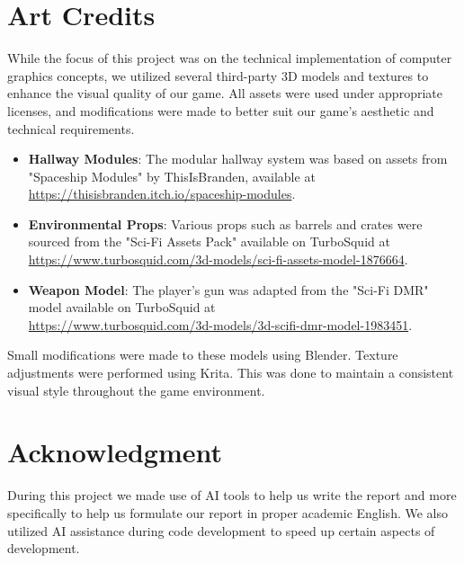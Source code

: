 \documentclass{article}
\begin{document}
\pagebreak
\section{Art Credits}
While the focus of this project was on the technical implementation of computer graphics concepts, we utilized several third-party 3D models and textures to enhance the visual quality of our game. All assets were used under appropriate licenses, and modifications were made to better suit our game's aesthetic and technical requirements.

\begin{itemize}
    \item \textbf{Hallway Modules}: The modular hallway system was based on assets from "Spaceship Modules" by ThisIsBranden, available at \url{https://thisisbranden.itch.io/spaceship-modules}.

    \item \textbf{Environmental Props}: Various props such as barrels and crates were sourced from the "Sci-Fi Assets Pack" available on TurboSquid at \url{https://www.turbosquid.com/3d-models/sci-fi-assets-model-1876664}.

    \item \textbf{Weapon Model}: The player's gun was adapted from the "Sci-Fi DMR" model available on TurboSquid at\\\url{https://www.turbosquid.com/3d-models/3d-scifi-dmr-model-1983451}.
\end{itemize}

Small modifications were made to these models using Blender. Texture adjustments were performed using Krita. This was done to maintain a consistent visual style throughout the game environment.

\section{Acknowledgment}
During this project we made use of AI tools to help us write the report and more
specifically to help us formulate our report in proper academic English. We also
utilized AI assistance during code development to speed up certain aspects of development.

% 
% 
\end{document}
